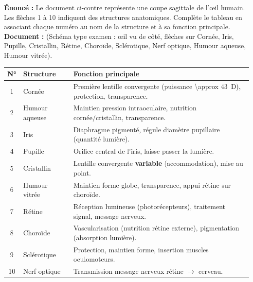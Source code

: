 \documentclass[11pt]{article}
\begin{document}
\begin{exoresolu}
\textbf{Énoncé :} Le document ci-contre représente une coupe sagittale de l'œil humain. Les flèches 1 à 10 indiquent des structures anatomiques. Complète le tableau en associant chaque numéro au nom de la structure et à sa fonction principale.
\textbf{Document :} (Schéma type examen : œil vu de côté, flèches sur Cornée, Iris, Pupille, Cristallin, Rétine, Choroïde, Sclérotique, Nerf optique, Humour aqueuse, Humour vitrée).

\begin{center}
\begin{tabularx}{\linewidth}{|c|X|X|}\hline
\rowcolor{popblueL}
\textbf{N°} & \textbf{Structure} & \textbf{Fonction principale} \\ \hline
1 & Cornée & Première lentille convergente (puissance \SI{\approx 43}{D}), protection, transparence. \\ \hline
2 & Humour aqueuse & Maintien pression intraoculaire, nutrition cornée/cristallin, transparence. \\ \hline
3 & Iris & Diaphragme pigmenté, régule diamètre pupillaire (quantité lumière). \\ \hline
4 & Pupille & Orifice central de l'iris, laisse passer la lumière. \\ \hline
5 & Cristallin & Lentille convergente \textbf{variable} (accommodation), mise au point. \\ \hline
6 & Humour vitrée & Maintien forme globe, transparence, appui rétine sur choroïde. \\ \hline
7 & Rétine & Réception lumineuse (photorécepteurs), traitement signal, message nerveux. \\ \hline
8 & Choroïde & Vascularisation (nutrition rétine externe), pigmentation (absorption lumière). \\ \hline
9 & Sclérotique & Protection, maintien forme, insertion muscles oculomoteurs. \\ \hline
10 & Nerf optique & Transmission message nerveux rétine $\to$ cerveau. \\ \hline
\end{tabularx}
\end{center}


\end{exoresolu}
\end{document}
